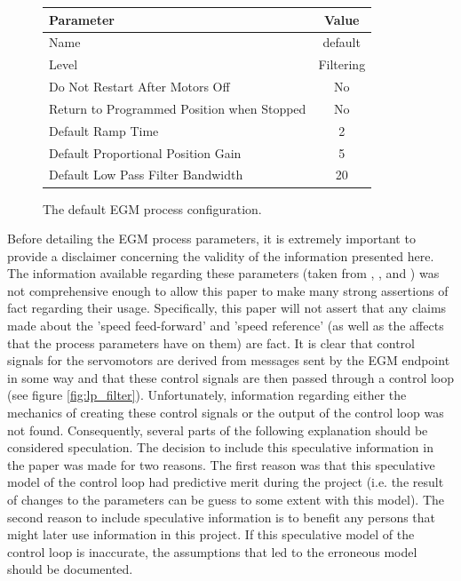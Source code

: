 \documentclass{cslthse-msc}
\begin{document}
\begin{figure}[H]
\vspace{0.5cm}
    \centering
    \begin{tabular}{| l | c |}
    \hline
        \textbf{Parameter} & \textbf{Value} \\ \hline
        Name        &   default \\
        Level       &   Filtering   \\
        Do Not Restart After Motors Off & No    \\
        Return to Programmed Position when Stopped & No \\
        Default Ramp Time & 2   \\
        Default Proportional Position Gain & 5  \\
        Default Low Pass Filter Bandwidth & 20  \\ \hline
    \end{tabular}
    \caption{The default EGM process configuration.}
    \label{fig:process_config}
\end{figure}
\vspace{0.5cm}
Before detailing the EGM process parameters, it is extremely important to provide a disclaimer concerning the validity of the information presented here. The information available regarding these parameters (taken from \cite[Sec. 9.3.2.5]{ABB:controller_software}, \cite[Sec. 9.3.4]{ABB:controller_software}, and \cite[Sec. 6.12]{ABB:system_parameters}) was not comprehensive enough to allow this paper to make many strong assertions of fact regarding their usage. Specifically, this paper will not assert that any claims made about the 'speed feed-forward' and 'speed reference' (as well as the affects that the process parameters have on them) are fact. It is clear that control signals for the servomotors are derived from messages sent by the EGM endpoint in some way and that these control signals are then passed through a control loop (see figure \ref{fig:lp_filter}). Unfortunately, information regarding either the mechanics of creating these control signals or the output of the control loop was not found. Consequently, several parts of the following explanation should be considered speculation. The decision to include this speculative information in the paper was made for two reasons. The first reason was that this speculative model of the control loop had predictive merit during the project (i.e. the result of changes to the parameters can be guess to some extent with this model). The second reason to include speculative information is to benefit any persons that might later use information in this project. If this speculative model of the control loop is inaccurate, the assumptions that led to the erroneous model should be documented. \par
\end{document}
